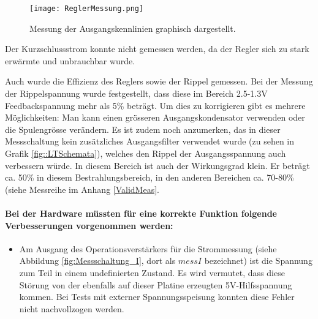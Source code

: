\begin{figure}[h]
\texttt{[image: ReglerMessung.png]}%
\caption{Messung der Ausgangskennlinien graphisch dargestellt.}
\label{fig::Reglermessung}
\end{figure}

Der Kurzschlussstrom konnte nicht gemessen werden, da der Regler sich zu stark erwärmte und unbrauchbar wurde.

Auch wurde die Effizienz des Reglers sowie der Rippel gemessen.
Bei der Messung der Rippelspannung wurde festgestellt, dass diese im Bereich 2.5-1.3V Feedbackspannung mehr als 5\% beträgt.
Um dies zu korrigieren gibt es mehrere Möglichkeiten: Man kann einen grösseren Ausgangskondensator verwenden oder die Spulengrösse verändern. Es ist zudem noch anzumerken, das in dieser Messschaltung kein zusätzliches Ausgangsfilter verwendet wurde (zu sehen in Grafik \ref{fig::LTSchemata}), welches den Rippel der Ausgangsspannung auch verbessern würde. In diesem Bereich ist auch der Wirkungsgrad klein. Er beträgt ca. 50\% in diesem Bestrahlungsbereich, in den anderen Bereichen ca. 70-80\% (siehe Messreihe im Anhang \ref{ValidMeas}.

\paragraph{Bei der Hardware müssten für eine korrekte Funktion folgende Verbesserungen vorgenommen werden:}
\begin{itemize}
	\item Am Ausgang des Operationsverstärkers für die Strommessung (siehe Abbildung \ref{fig:Messschaltung_I}, dort als $messI$ bezeichnet) ist die Spannung zum Teil in einem undefinierten Zustand. Es wird vermutet, dass diese Störung von der ebenfalls auf dieser Platine erzeugten 5V-Hilfsspannung kommen. Bei Tests mit externer Spannungsspeisung konnten diese Fehler nicht nachvollzogen werden.
\end{itemize}